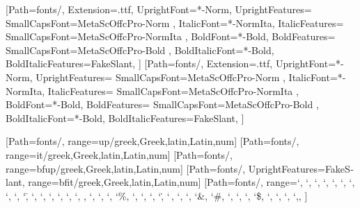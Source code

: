 
\usepackage[mathrm=sym, mathit=sym, mathsf=sym, mathbf=sym]{unicode-math}
\setmainfont{MetaOffcPro}[Path=fonts/,
	Extension=.ttf,
	UprightFont=*-Norm,
	UprightFeatures={
		SmallCapsFont={MetaScOffcPro-Norm}
	},
	ItalicFont=*-NormIta,
	ItalicFeatures={
		SmallCapsFont={MetaScOffcPro-NormIta}
	},
	BoldFont=*-Bold,
	BoldFeatures={
		SmallCapsFont={MetaScOffcPro-Bold}
	},
	BoldItalicFont=*-Bold,
	BoldItalicFeatures={FakeSlant},
]
\setsansfont{MetaOffcPro}[Path=fonts/,
	Extension=.ttf,
	UprightFont=*-Norm,
	UprightFeatures={
		SmallCapsFont={MetaScOffcPro-Norm}
	},
	ItalicFont=*-NormIta,
	ItalicFeatures={
		SmallCapsFont={MetaScOffcPro-NormIta}
	},
	BoldFont=*-Bold,
	BoldFeatures={
		SmallCapsFont={MetaScOffcPro-Bold}
	},
	BoldItalicFont=*-Bold,
	BoldItalicFeatures={FakeSlant},
]

[Path=fonts/,
range=up/{greek,Greek,latin,Latin,num}]
[Path=fonts/,
range=it/{greek,Greek,latin,Latin,num}]
[Path=fonts/,
range=bfup/{greek,Greek,latin,Latin,num}]
[Path=fonts/, UprightFeatures={FakeSlant},
range=bfit/{greek,Greek,latin,Latin,num}]
[Path=fonts/,
range={`\+, `\-, `\×, `\÷, `\⋅, `\*, `\/, `\⁄, `\±,
	`\=, `\≠, `\≈, `\<, `\>, `\≤, `\≥, \partial, `\∞, `\†, `\‡,
	`\%, `\‰, `\!, `\?, `\., `\,, `\:, `\;, `\&, `\#, `\@,
	`\§, `\€, `\$, `\£, `\¥, `\©, `\®,},
]

\usepackage{polyglossia}
\setmainlanguage{german}

\usepackage[pantone312]{wwustyle-mod}
\usepackage{selnolig}
\usepackage{microtype}

